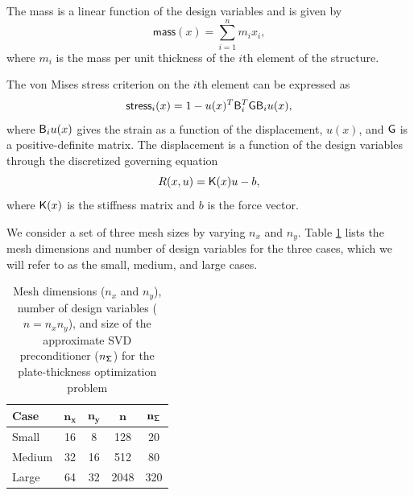The mass is a linear function
of the design variables and is given by
\begin{equation*}
  \textsf{mass}(x) = \sum_{i=1}^{n} m_i x_i,
\end{equation*}
where $m_i$ is the mass per unit thickness of the $i$th element of the
structure.
 

The von Mises stress
criterion on the $i$th element can be expressed as
\begin{equation*}
  \textsf{stress}_i(x) = 1 - u(x)^T \mathsf{B}_i^T \mathsf{G} \mathsf{B}_i u(x),
\end{equation*}
where $\mathsf{B}_i u(x)$ gives the strain as a function of the displacement,
$u(x)$, and $\mathsf{G}$ is a positive-definite matrix.  The displacement is a
function of the design variables through the discretized governing equation
\begin{equation*}
  R(x,u) = \mathsf{K}(x) u - b,
\end{equation*}
where $\mathsf{K}(x)$ is the stiffness matrix and $b$ is the force vector.

We consider a set of three mesh sizes by varying $n_x$ and $n_y$.  Table
\ref{tab:mesh_sizes} lists the mesh dimensions and number of design variables
for the three cases, which we will refer to as the small, medium, and large
cases.

\begin{table}[tbp]
  \begin{center}
    \caption{Mesh dimensions ($n_x$ and $n_y$), number of design variables ($n =
      n_x n_y$), and size of the approximate SVD preconditioner
      ($n_{\mathsf{\Sigma}}$) for the plate-thickness optimization
      problem \label{tab:mesh_sizes}}
  \begin{tabular}{ l c c c c}
    \textbf{Case} & $\mathbf{n_x}$  & $\mathbf{n_y}$ & $\mathbf{n}$
    & $\mathbf{{n_{\mathsf{\Sigma}}}}$
    \\ \hline
    \rule{0ex}{3ex}%
    Small  &   16 & 8  & 128  & 20 \\ 
    Medium &   32 & 16 & 512  & 80 \\  
    Large  &   64 & 32 & 2048 & 320  
  \end{tabular}
  \end{center}
\end{table}

